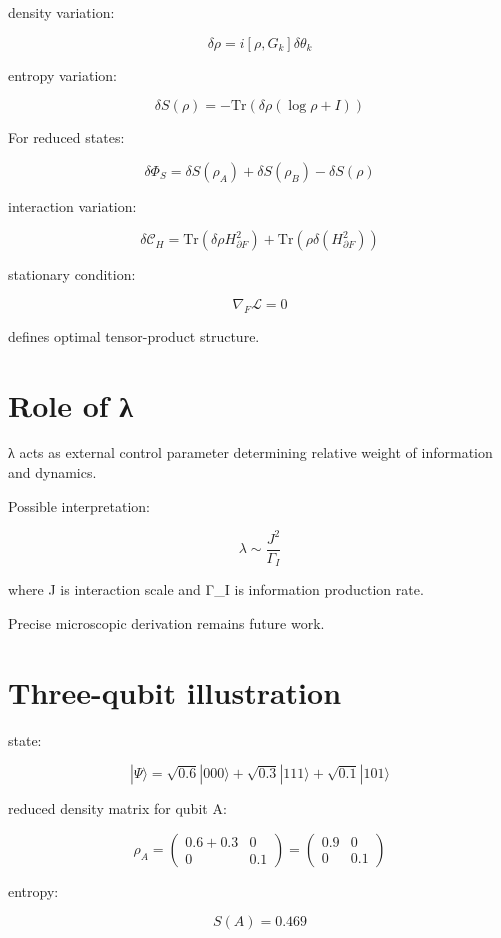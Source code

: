 \documentclass[11pt]{article}
\begin{document}
density variation:

\[
\delta\rho
=
i[\rho,G_k]\delta\theta_k
\]

entropy variation:

\[
\delta S(\rho)
=
-\mathrm{Tr}(\delta\rho(\log\rho+I))
\]

For reduced states:

\[
\delta\Phi_S
=
\delta S(\rho_A)
+
\delta S(\rho_B)
-
\delta S(\rho)
\]

interaction variation:

\[
\delta \mathcal C_H
=
\mathrm{Tr}(\delta\rho H_{\partial F}^2)
+
\mathrm{Tr}(\rho\delta(H_{\partial F}^2))
\]

stationary condition:

\[
\nabla_F\mathcal L=0
\]

defines optimal tensor-product structure.

\section{Role of λ}

λ acts as external control parameter
determining relative weight of information and dynamics.

Possible interpretation:

\[
\lambda
\sim
\frac{J^2}{\Gamma_I}
\]

where J is interaction scale
and Γ_I is information production rate.

Precise microscopic derivation remains future work.

\section{Three-qubit illustration}

state:

\[
|\Psi\rangle
=
\sqrt{0.6}|000\rangle
+
\sqrt{0.3}|111\rangle
+
\sqrt{0.1}|101\rangle
\]

reduced density matrix for qubit A:

\[
\rho_A
=
\begin{pmatrix}
0.6+0.3 & 0 \\
0 & 0.1
\end{pmatrix}
=
\begin{pmatrix}
0.9 & 0 \\
0 & 0.1
\end{pmatrix}
\]

entropy:

\[
S(A)=0.469
\]
\end{document}
